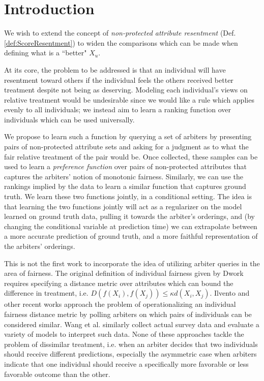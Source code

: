\section{Introduction}\label{sec:softmono_bg}
    
    We wish to extend the concept of \emph{non-protected attribute resentment} (Def. \ref{def:ScoreResentment}) to widen the comparisons which can be made when defining what is a ``better" $X_u$.
    
    At its core, the problem to be addressed is that an individual will have resentment toward others if the individual feels the others received better treatment despite not being as deserving.  Modeling each individual's views on relative treatment would be undesirable since we would like a rule which applies evenly to all individuals; we instead aim to learn a ranking function over individuals which can be used universally.  
    
    We propose to learn such a function by querying a set of arbiters by presenting pairs of non-protected attribute sets and asking for a judgment as to what the fair relative treatment of the pair would be. Once collected, these samples can be used to learn a \emph{preference function} over pairs of non-protected attributes that captures the arbiters' notion of monotonic fairness. Similarly, we can use the rankings implied by the data to learn a similar function that captures ground truth. We learn these two functions jointly, in a conditional setting. The idea is that learning the two functions jointly will act as a regularizer on the model learned on ground truth data, pulling it towards the arbiter's orderings, and (by changing the conditional variable at prediction time) we can extrapolate between a more accurate prediction of ground truth, and a more faithful representation of the arbiters' orderings.

    This is not the first work to incorporate the idea of utilizing arbiter queries in the area of fairness.  The original definition of individual fairness given by Dwork \cite{dwork2012fairness} requires specifying a distance metric over attributes which can bound the difference in treatment, i.e. $D\left(f(X_i), f(X_j)\right) \le \kappa d(X_i, X_j)$.  Ilvento\cite{ilvento2019metric} and other recent works \cite{jung2019eliciting,lahoti2019operationalizing,wang2019empirical} approach the problem of operationalizing an individual fairness distance metric by polling arbiters on which pairs of individuals can be considered similar.  Wang et al.\cite{wang2019empirical} similarly collect actual survey data and evaluate a variety of models to interpret such data.  None of these approaches tackle the problem of dissimilar treatment, i.e. when an arbiter decides that two individuals should receive different predictions, especially the asymmetric case when arbiters indicate that one individual should receive a specifically more favorable or less favorable outcome than the other.
    
